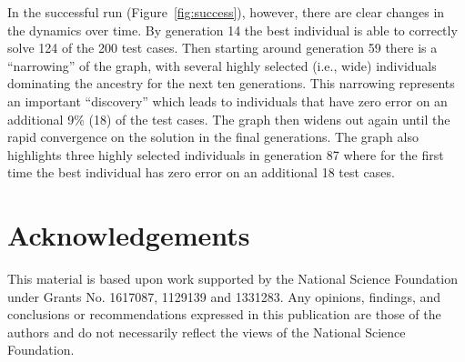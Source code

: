 In the successful run (Figure~\ref{fig:success}), however, there are clear changes in the dynamics over time. By generation 14 the best individual is able to correctly solve 124 of the 200 test cases. Then starting around generation 59 there is a ``narrowing'' of the graph, with several highly selected (i.e., wide) individuals dominating the ancestry for the next ten generations. This narrowing represents an important ``discovery'' which leads to individuals that have zero error on an additional 9\% (18) of the test cases. The graph then widens out again until the rapid convergence on the solution in the final generations. The graph also highlights three highly selected individuals in generation 87 where for the first time the best individual has zero error on an additional 18 test cases.

\section*{Acknowledgements}

This material is based upon work supported by the National Science Foundation under Grants No. 1617087, 1129139 and 1331283. Any opinions, findings, and conclusions or recommendations expressed in this publication are those of the authors and do not necessarily reflect the views of the National Science Foundation.
